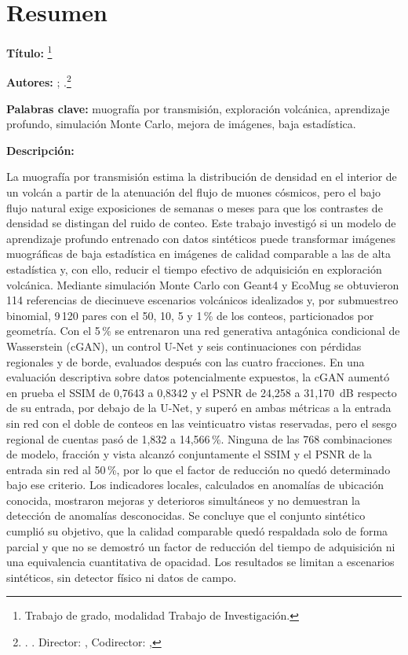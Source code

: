\chapter*{Resumen}
\label{pre:resumen}

\begingroup
{}
\setlength{\parindent}{0pt}
\setlength{\parskip}{0.7em}

\textbf{Título:} \TituloTrabajo\footnote{Trabajo de grado, modalidad Trabajo de Investigación.}

\textbf{Autores:} \AutorUno; \AutorDos.\footnote{\Facultad. \Escuela. Director: \DirectorNombre, \DirectorTitulo Codirector: \CodirectorNombre, \CodirectorTitulo}

\textbf{Palabras clave:} muografía por transmisión, exploración volcánica, aprendizaje profundo, simulación Monte Carlo, mejora de imágenes, baja estadística.

\textbf{Descripción:}

La muografía por transmisión estima la distribución de densidad en el interior de un volcán a partir de la atenuación del flujo de muones cósmicos, pero el bajo flujo natural exige exposiciones de semanas o meses para que los contrastes de densidad se distingan del ruido de conteo. Este trabajo investigó si un modelo de aprendizaje profundo entrenado con datos sintéticos puede transformar imágenes muográficas de baja estadística en imágenes de calidad comparable a las de alta estadística y, con ello, reducir el tiempo efectivo de adquisición en exploración volcánica. Mediante simulación Monte Carlo con Geant4 y EcoMug se obtuvieron 114 referencias de diecinueve escenarios volcánicos idealizados y, por submuestreo binomial, 9\,120 pares con el 50, 10, 5 y 1\,\% de los conteos, particionados por geometría. Con el 5\,\% se entrenaron una red generativa antagónica condicional de Wasserstein (cGAN), un control U-Net y seis continuaciones con pérdidas regionales y de borde, evaluados después con las cuatro fracciones. En una evaluación descriptiva sobre datos potencialmente expuestos, la cGAN aumentó en prueba el SSIM de 0,7643 a 0,8342 y el PSNR de 24,258 a 31,170~dB respecto de su entrada, por debajo de la U-Net, y superó en ambas métricas a la entrada sin red con el doble de conteos en las veinticuatro vistas reservadas, pero el sesgo regional de cuentas pasó de 1,832 a 14,566\,\%. Ninguna de las 768 combinaciones de modelo, fracción y vista alcanzó conjuntamente el SSIM y el PSNR de la entrada sin red al 50\,\%, por lo que el factor de reducción no quedó determinado bajo ese criterio. Los indicadores locales, calculados en anomalías de ubicación conocida, mostraron mejoras y deterioros simultáneos y no demuestran la detección de anomalías desconocidas. Se concluye que el conjunto sintético cumplió su objetivo, que la calidad comparable quedó respaldada solo de forma parcial y que no se demostró un factor de reducción del tiempo de adquisición ni una equivalencia cuantitativa de opacidad. Los resultados se limitan a escenarios sintéticos, sin detector físico ni datos de campo.

\endgroup

